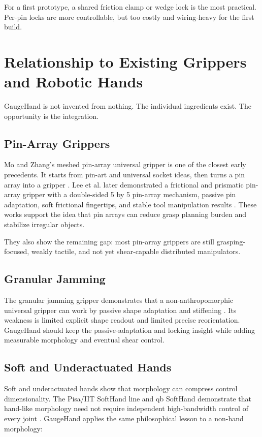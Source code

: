 \documentclass[11pt]{article}
\newcommand{\GaugeHand}{GaugeHand}
\begin{document}
For a first prototype, a shared friction clamp or wedge lock is the most practical. Per-pin locks are more controllable, but too costly and wiring-heavy for the first build.

\section{Relationship to Existing Grippers and Robotic Hands}

\GaugeHand{} is not invented from nothing. The individual ingredients exist. The opportunity is the integration.

\subsection{Pin-Array Grippers}

Mo and Zhang's meshed pin-array universal gripper is one of the closest early precedents. It starts from pin-art and universal socket ideas, then turns a pin array into a gripper \cite{mo2019meshed}. Lee et al. later demonstrated a frictional and prismatic pin-array gripper with a double-sided 5 by 5 pin-array mechanism, passive pin adaptation, soft frictional fingertips, and stable tool manipulation results \cite{lee2025frictional}. These works support the idea that pin arrays can reduce grasp planning burden and stabilize irregular objects.

They also show the remaining gap: most pin-array grippers are still grasping-focused, weakly tactile, and not yet shear-capable distributed manipulators.

\subsection{Granular Jamming}

The granular jamming gripper demonstrates that a non-anthropomorphic universal gripper can work by passive shape adaptation and stiffening \cite{brown2010jamming}. Its weakness is limited explicit shape readout and limited precise reorientation. \GaugeHand{} should keep the passive-adaptation and locking insight while adding measurable morphology and eventual shear control.

\subsection{Soft and Underactuated Hands}

Soft and underactuated hands show that morphology can compress control dimensionality. The Pisa/IIT SoftHand line and qb SoftHand demonstrate that hand-like morphology need not require independent high-bandwidth control of every joint \cite{dellasantina2018softhand2,qbsofthand}. \GaugeHand{} applies the same philosophical lesson to a non-hand morphology:
\end{document}

